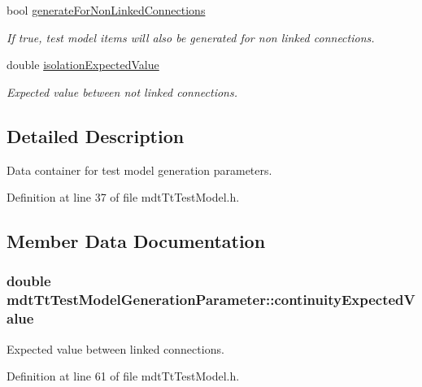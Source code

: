 \begin{DoxyCompactItemize}
bool \hyperlink{structmdt_tt_test_model_generation_parameter_acfd7fa91840f9e8092a25f9c41ce751d}{generate\-For\-Non\-Linked\-Connections}
\begin{DoxyCompactList}\small\item\em If true, test model items will also be generated for non linked connections. \end{DoxyCompactList}\item 
double \hyperlink{structmdt_tt_test_model_generation_parameter_aef12a7b98660799b54525a8e39263686}{isolation\-Expected\-Value}
\begin{DoxyCompactList}\small\item\em Expected value between not linked connections. \end{DoxyCompactList}\end{DoxyCompactItemize}


\subsection{Detailed Description}
Data container for test model generation parameters. 

Definition at line 37 of file mdt\-Tt\-Test\-Model.\-h.



\subsection{Member Data Documentation}
\hypertarget{structmdt_tt_test_model_generation_parameter_a2ef746fefd93196b2b0adcbbcd57406c}{
\subsubsection[{continuity\-Expected\-Value}]{\setlength{\rightskip}{0pt plus 5cm}double mdt\-Tt\-Test\-Model\-Generation\-Parameter\-::continuity\-Expected\-Value}}\label{structmdt_tt_test_model_generation_parameter_a2ef746fefd93196b2b0adcbbcd57406c}


Expected value between linked connections. 



Definition at line 61 of file mdt\-Tt\-Test\-Model.\-h.




